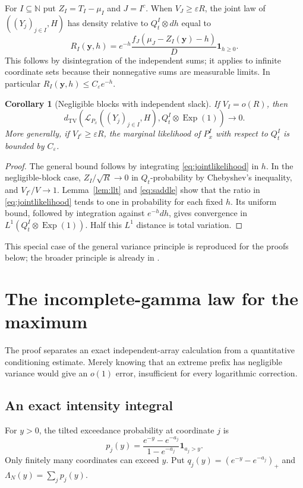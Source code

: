 \documentclass[11pt,a4paper]{article}
\numberwithin{equation}{section}
\newtheorem{corollary}[theorem]{Corollary}
\theoremstyle{definition}
\theoremstyle{remark}
\newcommand{\N}{\mathbb N}
\newcommand{\ind}{\mathbf 1}
\newcommand{\Law}{\mathcal L}
\newcommand{\Exp}{\operatorname{Exp}}
\newcommand{\TV}{d_{\mathrm{TV}}}
\newcommand{\eps}{\varepsilon}
\begin{document}
For $I\subseteq\N$ put $Z_I=T_I-\mu_I$ and $J=I^c$. When
$V_J\ge\eps R$, the joint law of $((Y_j)_{j\in I},H)$ has density
relative to $Q_t^I\otimes dh$ equal to
\begin{equation}
 R_I(\mathbf y,h)=
 e^{-h}\frac{f_J(\mu_J-Z_I(\mathbf y)-h)}D\ind_{h\ge0}.
 \label{eq:jointlikelihood}
\end{equation}
This follows by disintegration of the independent sums; it applies to
infinite coordinate sets because their nonnegative sums are measurable
limits. In particular $R_I(\mathbf y,h)\le C_\eps e^{-h}$.

\begin{corollary}[Negligible blocks with independent slack]
\label{cor:smallblock}
If $V_I=o(R)$, then
\begin{equation}
 \TV\!\left(\Law_{P_x}((Y_j)_{j\in I},H),
             Q_t^I\otimes\Exp(1)\right)\longrightarrow0.
 \label{eq:smallblock}
\end{equation}
More generally, if $V_{I^c}\ge\eps R$, the marginal likelihood of
$P_x^I$ with respect to $Q_t^I$ is bounded by $C_\eps$.
\end{corollary}
\begin{proof}
The general bound follows by integrating
\eqref{eq:jointlikelihood} in $h$. In the negligible-block case,
$Z_I/\sqrt R\to0$ in $Q_t$-probability by Chebyshev's inequality,
and $V_{I^c}/V\to1$. Lemma~\ref{lem:llt} and
\eqref{eq:saddle} show that the ratio in
\eqref{eq:jointlikelihood} tends to one in probability for each fixed
$h$. Its uniform bound, followed by integration against $e^{-h}dh$,
gives convergence in $L^1(Q_t^I\otimes\Exp(1))$. Half this $L^1$
distance is total variation.
\end{proof}
This special case of the general variance principle is reproduced for
the proofs below; the broader principle is already in \cite{repounif}.

\section{The incomplete-gamma law for the maximum}
\label{sec:maximum}

The proof separates an exact independent-array calculation from a
quantitative conditioning estimate. Merely knowing that an extreme
prefix has negligible variance would give an $o(1)$ error, insufficient
for every logarithmic correction.

\subsection{An exact intensity integral}
For $y>0$, the tilted exceedance probability at coordinate $j$ is
\begin{equation}
 p_j(y)=\frac{e^{-y}-e^{-a_j}}{1-e^{-a_j}}\ind_{a_j>y}.
 \label{eq:exceedance}
\end{equation}
Only finitely many coordinates can exceed $y$. Put
$q_j(y)=(e^{-y}-e^{-a_j})_+$ and
$\Lambda_N(y)=\sum_jp_j(y)$.
\end{document}
